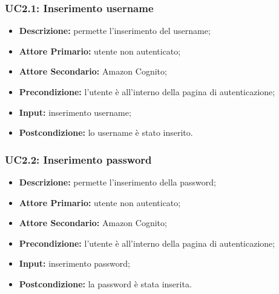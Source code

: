 \subsubsection{UC2.1: Inserimento username}
\label{sec:UC2.1}
\begin{itemize}
    \item \textbf{Descrizione:} permette l'inserimento del username;
    \item \textbf{Attore Primario:} utente non autenticato;
    \item \textbf{Attore Secondario:} Amazon Cognito;
    \item \textbf{Precondizione:} l'utente è all'interno della pagina di autenticazione;
    \item \textbf{Input:} inserimento username;
    \item \textbf{Postcondizione:} lo username è stato inserito.
\end{itemize}
\subsubsection{UC2.2: Inserimento password}
\label{sec:UC2.2}
\begin{itemize}
    \item \textbf{Descrizione:} permette l'inserimento della password;
    \item \textbf{Attore Primario:} utente non autenticato;
    \item \textbf{Attore Secondario:} Amazon Cognito;
    \item \textbf{Precondizione:} l'utente è all'interno della pagina di autenticazione;
    \item \textbf{Input:} inserimento password;
    \item \textbf{Postcondizione:} la password è stata inserita.
\end{itemize}

